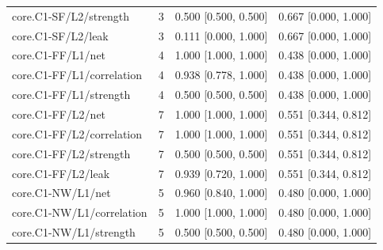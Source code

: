 \begin{longtable}{@{}p{1.9in}rl l@{}}
core.\allowbreak C1-SF/\allowbreak L2/\allowbreak strength & 3 & 0.500 [0.500, 0.500] & 0.667 [0.000, 1.000]\\
core.\allowbreak C1-SF/\allowbreak L2/\allowbreak leak & 3 & 0.111 [0.000, 1.000] & 0.667 [0.000, 1.000]\\
core.\allowbreak C1-FF/\allowbreak L1/\allowbreak net & 4 & 1.000 [1.000, 1.000] & 0.438 [0.000, 1.000]\\
core.\allowbreak C1-FF/\allowbreak L1/\allowbreak correlation & 4 & 0.938 [0.778, 1.000] & 0.438 [0.000, 1.000]\\
core.\allowbreak C1-FF/\allowbreak L1/\allowbreak strength & 4 & 0.500 [0.500, 0.500] & 0.438 [0.000, 1.000]\\
core.\allowbreak C1-FF/\allowbreak L2/\allowbreak net & 7 & 1.000 [1.000, 1.000] & 0.551 [0.344, 0.812]\\
core.\allowbreak C1-FF/\allowbreak L2/\allowbreak correlation & 7 & 1.000 [1.000, 1.000] & 0.551 [0.344, 0.812]\\
core.\allowbreak C1-FF/\allowbreak L2/\allowbreak strength & 7 & 0.500 [0.500, 0.500] & 0.551 [0.344, 0.812]\\
core.\allowbreak C1-FF/\allowbreak L2/\allowbreak leak & 7 & 0.939 [0.720, 1.000] & 0.551 [0.344, 0.812]\\
core.\allowbreak C1-NW/\allowbreak L1/\allowbreak net & 5 & 0.960 [0.840, 1.000] & 0.480 [0.000, 1.000]\\
core.\allowbreak C1-NW/\allowbreak L1/\allowbreak correlation & 5 & 1.000 [1.000, 1.000] & 0.480 [0.000, 1.000]\\
core.\allowbreak C1-NW/\allowbreak L1/\allowbreak strength & 5 & 0.500 [0.500, 0.500] & 0.480 [0.000, 1.000]\\

\end{longtable}
